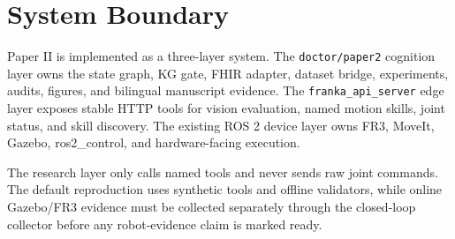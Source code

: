\section{System Boundary}
Paper II is implemented as a three-layer system. The \texttt{doctor/paper2}
cognition layer owns the state graph, KG gate, FHIR adapter, dataset bridge,
experiments, audits, figures, and bilingual manuscript evidence. The
\texttt{franka\_api\_server} edge layer exposes stable HTTP tools for vision
evaluation, named motion skills, joint status, and skill discovery. The existing
ROS 2 device layer owns FR3, MoveIt, Gazebo, ros2\_control, and hardware-facing
execution.

The research layer only calls named tools and never sends raw joint commands.
The default reproduction uses synthetic tools and offline validators, while
online Gazebo/FR3 evidence must be collected separately through the closed-loop
collector before any robot-evidence claim is marked ready.
